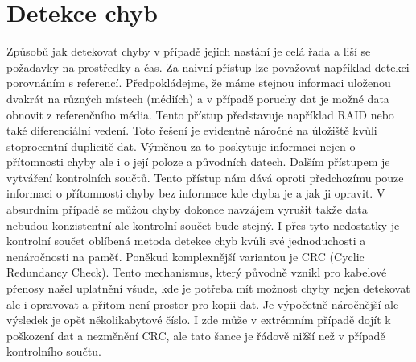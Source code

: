 \section{Detekce chyb}
Způsobů jak detekovat chyby v případě jejich nastání je celá řada a liší se požadavky na prostředky a čas. Za naivní přístup lze považovat například detekci porovnáním s referencí. Předpokládejme, že máme stejnou informaci uloženou dvakrát na různých místech (médiích) a v případě poruchy dat je možné data obnovit z referenčního média. Tento přístup představuje například RAID nebo také diferenciální vedení. Toto řešení je evidentně náročné na úložiště kvůli stoprocentní duplicitě dat. Výměnou za to poskytuje informaci nejen o přítomnosti chyby ale i o její poloze a původních datech. Dalším přístupem je vytváření kontrolních součtů. Tento přístup nám dává oproti předchozímu pouze informaci o přítomnosti chyby bez informace kde chyba je a jak ji opravit. V absurdním případě se můžou chyby dokonce navzájem vyrušit takže data nebudou konzistentní ale kontrolní součet bude stejný. I přes tyto nedostatky je kontrolní součet oblíbená metoda detekce chyb kvůli své jednoduchosti a nenáročnosti na paměť. Poněkud komplexnější variantou je CRC (Cyclic Redundancy Check). Tento mechanismus, který původně vznikl pro kabelové přenosy našel uplatnění všude, kde je potřeba mít možnost chyby nejen detekovat ale i opravovat a přitom není prostor pro kopii dat. Je výpočetně náročnější ale výsledek je opět několikabytové číslo. I zde může v extrémním případě dojít k poškození dat a nezměnění CRC, ale tato šance je řádově nižší než v případě kontrolního součtu.

